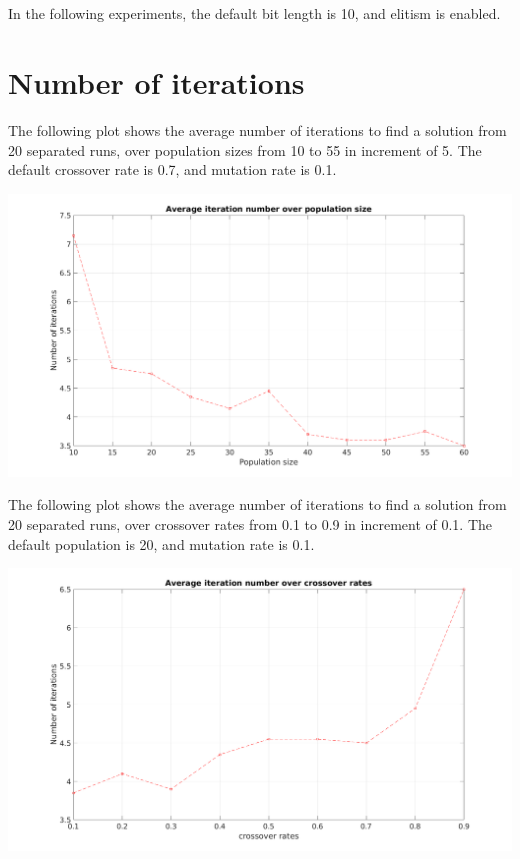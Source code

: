 \documentclass[paper=a4, fontsize=11pt]{scrartcl} %
\title{\hmwkClass \\
       \hmwkTitle}
\author{\hmwkAuthorFullName}
\date{\hmwkDueDate}
\begin{document}
    \maketitle
    \thispagestyle{fancy}

    In the following experiments, the default bit length is 10, and elitism is enabled.

    \section{Number of iterations}

    The following plot shows the average number of iterations to find a solution from 20 separated runs, over population sizes from 10 to 55 in increment of 5. The default crossover rate is 0.7, and mutation rate is 0.1.

    \includegraphics[width=\linewidth]{a1-onemax-population}

    \pagebreak

    The following plot shows the average number of iterations to find a solution from 20 separated runs, over crossover rates from 0.1 to 0.9 in increment of 0.1. The default population is 20, and mutation rate is 0.1.

    \includegraphics[width=\linewidth]{a1-onemax-crossover_iter}
\end{document}
